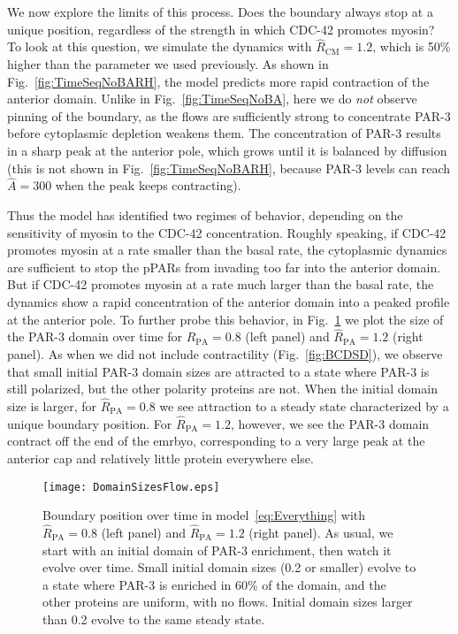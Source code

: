 \documentclass[11pt]{article}
\newcommand{\6}[1]{#1_{\text{6}}}
\newcommand{\3}[1]{#1_{\text{3}}}
\begin{document}
We now explore the limits of this process. Does the boundary always stop at a unique position, regardless of the strength in which CDC-42 promotes myosin? To look at this question, we simulate the dynamics with $\hat R_\text{CM}=1.2$, which is 50\% higher than the parameter we used previously. As shown in Fig.\ \ref{fig:TimeSeqNoBARH}, the model predicts more rapid contraction of the anterior domain. Unlike in Fig.\ \ref{fig:TimeSeqNoBA}, here we do \emph{not} observe pinning of the boundary, as the flows are sufficiently strong to concentrate PAR-3 before cytoplasmic depletion weakens them. The concentration of PAR-3 results in a sharp peak at the anterior pole, which grows until it is balanced by diffusion (this is not shown in Fig.\ \ref{fig:TimeSeqNoBARH}, because PAR-3 levels can reach $\hat A=300$ when the peak keeps contracting). 

Thus the model has identified two regimes of behavior, depending on the sensitivity of myosin to the CDC-42 concentration. Roughly speaking, if CDC-42 promotes myosin at a rate smaller than the basal rate, the cytoplasmic dynamics are sufficient to stop the pPARs from invading too far into the anterior domain. But if CDC-42 promotes myosin at a rate much larger than the basal rate, the dynamics show a rapid concentration of the anterior domain into a peaked profile at the anterior pole. 
To further probe this behavior, in Fig.\ \ref{fig:BPosNBA} we plot the size of the PAR-3 domain over time for $\hat R_\text{PA}=0.8$ (left panel) and $\hat R_\text{PA}=1.2$ (right panel). As when we did not include contractility (Fig.\ \ref{fig:BCDSD}), we observe that small initial PAR-3 domain sizes are attracted to a state where PAR-3 is still polarized, but the other polarity proteins are not. When the initial domain size is larger, for $\hat R_\text{PA}=0.8$ we see attraction to a steady state characterized by a unique boundary position. For $\hat R_\text{PA}=1.2$, however, we see the PAR-3 domain contract off the end of the emrbyo, corresponding to a very large peak at the anterior cap and relatively little protein everywhere else. 

\begin{figure}
\centering
\texttt{[image: DomainSizesFlow.eps]}
\caption{\label{fig:BPosNBA}Boundary position over time in model\ \eqref{eq:Everything} with $\hat R_\text{PA}=0.8$ (left panel) and $\hat R_\text{PA}=1.2$ (right panel). As usual, we start with an initial domain of PAR-3 enrichment, then watch it evolve over time. Small initial domain sizes (0.2 or smaller) evolve to a state where PAR-3 is enriched in 60\% of the domain, and the other proteins are uniform, with no flows. Initial domain sizes larger than 0.2 evolve to the same steady state.}
\end{figure}
\end{document}
